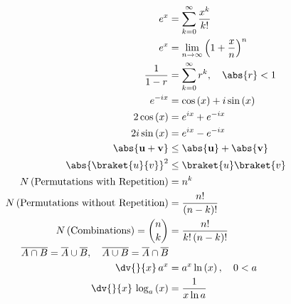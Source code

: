 \begin{subequations}\label{eq:additional:misc:math}
\begin{align}
e^{x} &= \sum_{k=0}^{\infty} \frac{x^{k}}{k!} \label{eq:additional:misc:math:ex} \\
e^{x} &= \lim_{n \to \infty} \left(1 + \frac{x}{n}\right)^{n} \label{eq:additional:misc:math:ex_limit} \\
\frac{1}{1-r} &= \sum_{k=0}^{\infty} r^{k}, \quad \abs{r} < 1 \label{eq:additional:misc:math:geometric} \\
e^{-i x} &= \cos\left(x\right) + i \sin\left(x\right) \label{eq:additional:misc:math:eulers_formula} \\
2 \cos\left(x\right) &= e^{i x} + e^{-i x} \label{eq:additional:misc:math:cos_exp} \\
2i \sin\left(x\right) &= e^{i x} - e^{-i x} \label{eq:additional:misc:math:sin_exp} \\
\abs{\mathbf{u} + \mathbf{v}} &\leq \abs{\mathbf{u}} + \abs{\mathbf{v}} \label{eq:additional:misc:math:triangle_inequality} \\
\abs{\braket{u}{v}}^{2} &\leq \braket{u} \braket{v} \label{eq:additional:misc:math:cauchy_schwarz_inequality} \\
N\left(\text{Permutations with Repetition}\right) &= n^{k}  \label{eq:additional:misc:math:permutations_with_repetition} \\
N\left(\text{Permutations without Repetition}\right) &= \frac{n!}{\left(n-k\right)!}  \label{eq:additional:misc:math:permutations_without_repetition} \\
N\left(\text{Combinations}\right) = {n \choose k} &= \frac{n!}{k!\left(n-k\right)!} \label{eq:additional:misc:math:binomial_coefficient} \\
\overline{A \cap B} = \overline{A} \cup \overline{B},\quad \overline{A \cup B} = \overline{A} \cap \overline{B} \label{eq:additional:misc:math:de_morgan} \\
\dv{}{x}\, a^{x} &= a^{x} \ln\left(x\right), \quad 0 < a \label{eq:additional:misc:math:diff_exp_gen} \\
\dv{}{x}\, \log_{a}\left(x\right) &= \frac{1}{x \ln a} \label{eq:additional:misc:math:diff_log_gen}
\end{align}
\end{subequations}
